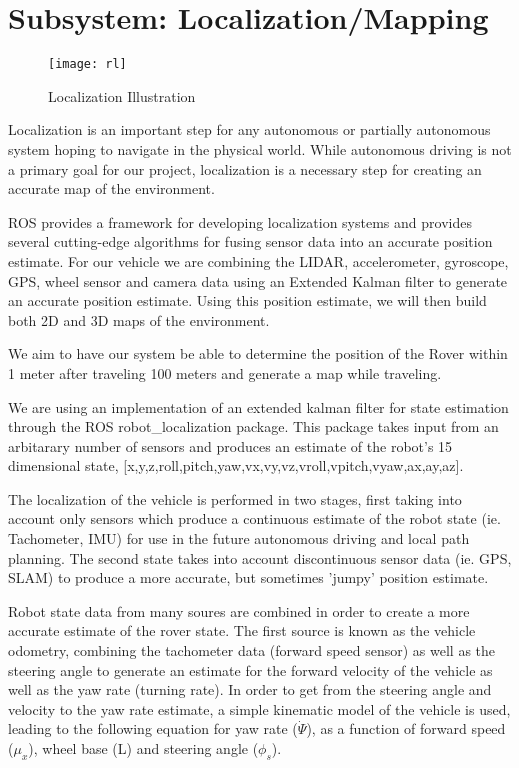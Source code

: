 \chapter{Subsystem: Localization/Mapping} \label{chap:Localization}


\begin{figure}[H]
\centerline{\texttt{[image: rl]}}
\caption[]{Localization Illustration \cite{clearpath}}
\label{fig:robotlocalization}
\end{figure}

Localization is an important step for any autonomous or partially autonomous system hoping to navigate in the physical world. While autonomous driving is not a primary goal for our project, localization is a necessary step for creating an accurate map of the environment. 

ROS provides a framework for developing localization systems and provides several cutting-edge algorithms for fusing sensor data into an accurate position estimate. For our vehicle we are combining the LIDAR, accelerometer, gyroscope, GPS, wheel sensor and camera data using an Extended Kalman filter to generate an accurate position estimate. Using this position estimate, we will then build both 2D and 3D maps of the environment. 

We aim to have our system be able to determine the position of the Rover within 1 meter after traveling 100 meters and generate a map while traveling.

We are using an implementation of an extended kalman filter for state estimation through the ROS robot\_localization package. This package takes input from an arbitarary number of sensors and produces an estimate of the robot's 15 dimensional state, [x,y,z,roll,pitch,yaw,vx,vy,vz,vroll,vpitch,vyaw,ax,ay,az]\cite{Moore2016}. 

The localization of the vehicle is performed in two stages, first taking into account only sensors which produce a continuous estimate of the robot state (ie. Tachometer, IMU) for use in the future autonomous driving and local path planning. The second state takes into account discontinuous sensor data (ie. GPS, SLAM) to produce a more accurate, but sometimes 'jumpy' position estimate. 

Robot state data from many soures are combined in order to create a more accurate estimate of the rover state. The first source is known as the vehicle odometry, combining the tachometer data (forward speed sensor) as well as the steering angle to generate an estimate for the forward velocity of the vehicle as well as the yaw rate (turning rate). In order to get from the steering angle and velocity to the yaw rate estimate, a simple kinematic model of the vehicle is used, leading to the following equation for yaw rate ($\dot{\Psi}$), as a function of forward speed ($\mu_x$), wheel base (L) and steering angle ($\phi_s$).

